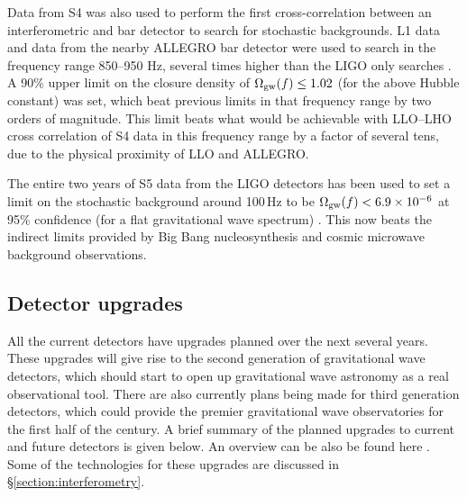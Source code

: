 \documentclass{article}
\begin{document}
Data from S4 was also used to perform the first cross-correlation between an
interferometric and bar detector to search for stochastic backgrounds. L1 data
and data from the nearby ALLEGRO bar detector were used to search in the
frequency range 850--950 Hz, several times higher than the LIGO only searches
\cite{Abbott:2007g}. A 90\% upper limit on the closure density of $\Omega_{\rm
gw}(f) \leq 1.02$ (for the above Hubble constant) was set, which beat previous
limits in that frequency range by two orders of magnitude. This limit beats what
would be achievable with LLO--LHO cross correlation of S4 data in this frequency
range by a factor of several tens, due to the physical proximity of LLO and
ALLEGRO.

The entire two years of S5 data from the LIGO detectors has been used to set a
limit on the stochastic background around 100\,Hz to be $\Omega_{\rm
gw}(f) < 6.9\times10^{-6}$ at 95\% confidence (for a flat gravitational wave
spectrum) \cite{Abbott:2009b}. This now beats the indirect limits provided by
Big Bang nucleosynthesis and cosmic microwave background observations.

\subsection{Detector upgrades}
All the current detectors have upgrades planned over the next several years.
These upgrades will give rise to the second generation of gravitational wave
detectors, which should start to open up gravitational wave astronomy as a
real observational tool. There are also currently plans being made for third
generation detectors, which could provide the premier gravitational wave
observatories for the first half of the century. A brief summary of the planned
upgrades to current and future detectors is given below. An overview can be also
be found here \cite{Whitcomb:2008}. Some of the technologies for these upgrades
are discussed in \S\ref{section:interferometry}.
\end{document}
